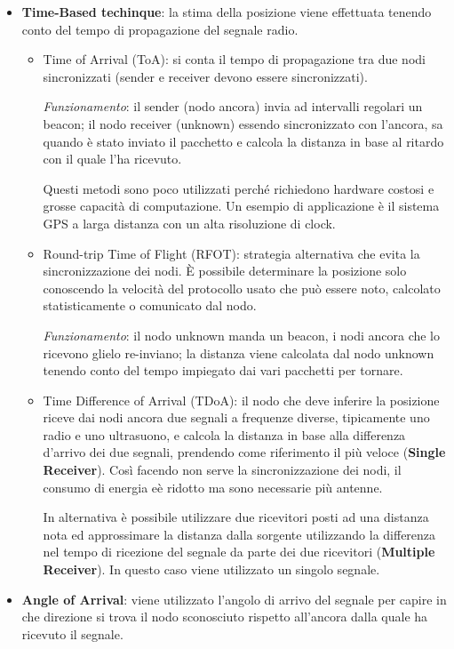 \begin{itemize}
    \item \textbf{Time-Based techinque}: la stima della posizione viene effettuata tenendo conto
    del tempo di propagazione del segnale radio.
    \begin{itemize}
        \item Time of Arrival (ToA): si conta il tempo di propagazione tra due
        nodi sincronizzati (sender e receiver devono essere sincronizzati).

		\textit{Funzionamento}: il sender (nodo ancora) invia ad intervalli regolari un beacon; il nodo receiver (unknown) essendo sincronizzato con l'ancora, sa quando è stato inviato il pacchetto e calcola la distanza in base al ritardo con il quale l'ha ricevuto.

        Questi metodi sono poco utilizzati perché richiedono hardware costosi e grosse capacità
        di computazione. Un esempio di applicazione è il sistema GPS a larga distanza
        con un alta risoluzione di clock.

        \item Round-trip Time of Flight (RFOT): strategia alternativa che evita la
        sincronizzazione dei nodi. \`E possibile determinare la posizione solo conoscendo
        la velocità del protocollo usato che può essere noto, calcolato statisticamente
        o comunicato dal nodo.

        \textit{Funzionamento}: il nodo unknown manda un beacon, i nodi ancora che lo ricevono glielo re-inviano; la distanza viene calcolata dal nodo unknown tenendo conto del tempo impiegato dai vari pacchetti per tornare.

        \item Time Difference of Arrival (TDoA): il nodo che deve inferire la posizione riceve dai nodi ancora due segnali a frequenze diverse, tipicamente uno radio e uno ultrasuono, e calcola la distanza in base alla differenza d'arrivo dei due segnali, prendendo come riferimento il più veloce (\textbf{Single Receiver}).
        Così facendo non serve la sincronizzazione dei nodi, il consumo di energia eè ridotto ma sono necessarie più antenne.

        In alternativa è possibile utilizzare due ricevitori posti ad una distanza nota ed approssimare la distanza dalla sorgente utilizzando la differenza nel tempo di ricezione del segnale da parte dei due ricevitori (\textbf{Multiple Receiver}).
        In questo caso viene utilizzato un singolo segnale.
    \end{itemize}
    \item \textbf{Angle of Arrival}: viene utilizzato l'angolo di arrivo del segnale per capire in che direzione si trova il nodo sconosciuto rispetto all'ancora dalla quale ha ricevuto il segnale.


\end{itemize}
